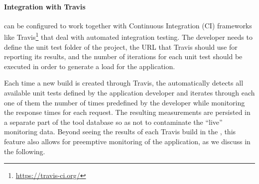   \paragraph{Integration with Travis}
  

   can be configured to work together with Continuous Integration (CI) frameworks like Travis\footnote{\url{https://travis-ci.org/}} that deal with automated integration testing.
  The developer needs to define the unit test folder of the project, the URL that Travis should use for reporting its results, and the number of iterations for each unit test should be executed in order to generate a load for the application. 
  
  Each time a new build is created through Travis, the \tool automatically detects all available unit tests defined by the application developer and iterates through each one of them the number of times predefined by the developer while monitoring the response times for each request. The resulting measurements are persisted in a separate part of the tool database so as not to contaminate the ``live'' monitoring data. Beyond seeing the results of each Travis build in the \tool, this feature also allows for preemptive monitoring of the application, as we discuss in the following.    

  
  

